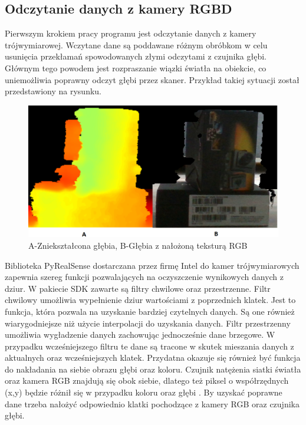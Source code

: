 \subsection{Odczytanie danych z kamery RGBD}
Pierwszym krokiem pracy programu jest odczytanie danych z kamery trójwymiarowej. Wczytane dane są poddawane różnym obróbkom w celu usunięcia przekłamań spowodowanych złymi odczytami z czujnika głębi. Głównym tego powodem jest rozpraszanie wiązki światła na obiekcie, co uniemożliwia poprawny odczyt głębi przez skaner. Przykład takiej sytuacji został przedstawiony na rysunku.
\begin{figure}[H]
  \centering
  \includegraphics[scale=0.4]{pudelko_glebia_kolor.png}
  \caption{A-Zniekształcona głębia, B-Głębia z nałożoną teksturą RGB}   
  \label{fig:bpaZasada}
\end{figure}
Biblioteka PyRealSense dostarczana przez firmę Intel do kamer trójwymiarowych zapewnia szereg funkcji pozwalających na oczyszczenie wynikowych danych z dziur. W pakiecie SDK zawarte są filtry chwilowe oraz przestrzenne. Filtr chwilowy umożliwia wypełnienie dziur wartościami z poprzednich klatek. Jest to funkcja, która pozwala na uzyskanie bardziej czytelnych danych. Są one również wiarygodniejsze niż użycie interpolacji do uzyskania danych. Filtr przestrzenny umożliwia wygładzenie danych zachowując jednocześnie dane brzegowe. W przypadku wcześniejszego filtru te dane są tracone w skutek mieszania danych z aktualnych oraz wcześniejszych klatek. Przydatna okazuje się również być funkcja do nakładania na siebie obrazu głębi oraz koloru. Czujnik natężenia siatki światła oraz kamera RGB znajdują się obok siebie, dlatego też piksel o współrzędnych (x,y) będzie różnił się w przypadku koloru oraz głębi \cite{IntelRealSenseSheet}. By uzyskać poprawne dane trzeba nałożyć odpowiednio klatki pochodzące z kamery RGB oraz czujnika głębi.

